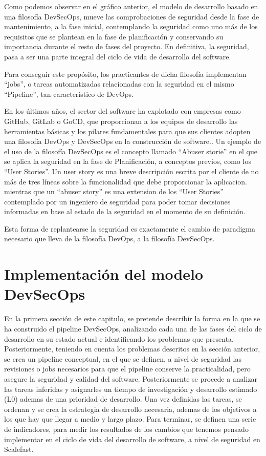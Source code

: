 \documentclass[12pt]{report} %
\begin{document}
Como podemos observar en el gráfico anterior, el modelo de desarrollo basado en
una filosofía DevSecOps, mueve las comprobaciones de seguridad desde la fase de
mantenimiento, a la fase inicial, contemplando la seguridad como uno más de los
requisitos que se plantean en la fase de planificación y conservando su
importancia durante el resto de fases del proyecto.  En definitiva, la
seguridad, pasa a ser una parte integral del ciclo de vida de desarrollo del
software. 

Para conseguir este propósito, los practicantes de dicha filosofía implementan
``jobs'', o tareas automatizadas relacionadas con la seguridad en el mismo
``Pipeline'', tan característico de DevOps.

En los últimos años, el sector del software ha explotado con empresas como
GitHub, GitLab o GoCD, que proporcionan a los equipos de desarrollo las
herramientas básicas y los pilares fundamentales para que sus clientes adopten
una filosofía DevOps y DevSecOps en la construcción de
software.\cite{Google2019}. Un ejemplo de el uso de la filosofía DevSecOps es el
concepto llamado ``Abuser storie'' \cite{Bor2006} en el que se aplica la
seguridad en la fase de Planificación, a conceptos previos, como los ``User
Stories''. Un user story es una breve descripción escrita por el cliente de no
más de tres líneas sobre la funcionalidad que debe proporcionar la aplicacion.
\cite{XPUserStory} mientras que un ``abuser story'' es una extension de los
``User Stories'' contemplado por un ingeniero de seguridad para poder tomar
decisiones informadas en base al estado de la seguridad en el momento de su
definición. \cite{Bor2006}

Esta forma de replantearse la seguridad es exactamente el cambio de paradigma
necesario que lleva de la filosofía \gls{DevOps}, a la filosofía
\gls{DevSecOps}.


\chapter{Implementación del modelo DevSecOps}

En la primera sección de este capitulo, se pretende describir la forma en la que
se ha construido el pipeline DevSecOps, analizando cada una de las fases del
ciclo de desarrollo en su estado actual e identificando los problemas que
presenta.  Posteriormente, teniendo en cuenta los problemas descritos en la
sección anterior, se crea un pipeline conceptual, en el que se definen, a nivel
de seguridad las revisiones o \gls{job}s necesarios para que el \gls{pipeline}
conserve la practicalidad, pero asegure la seguridad y calidad del software.
Posteriormente se procede a analizar las tareas inferidas y asignarles un tiempo
de investigación y desarrollo estimado (L0) ademas de una prioridad de
desarrollo.  Una vez definidas las tareas, se ordenan y se crea la estrategia de
desarrollo necesaria, ademas de los objetivos a los que hay que llegar a medio y
largo plazo.  Para terminar, se definen una serie de indicadores, para medir los
resultados de los cambios que tenemos pensado implementar en el ciclo de vida
del desarrollo de software, a nivel de seguridad en Scalefast.
\end{document}

